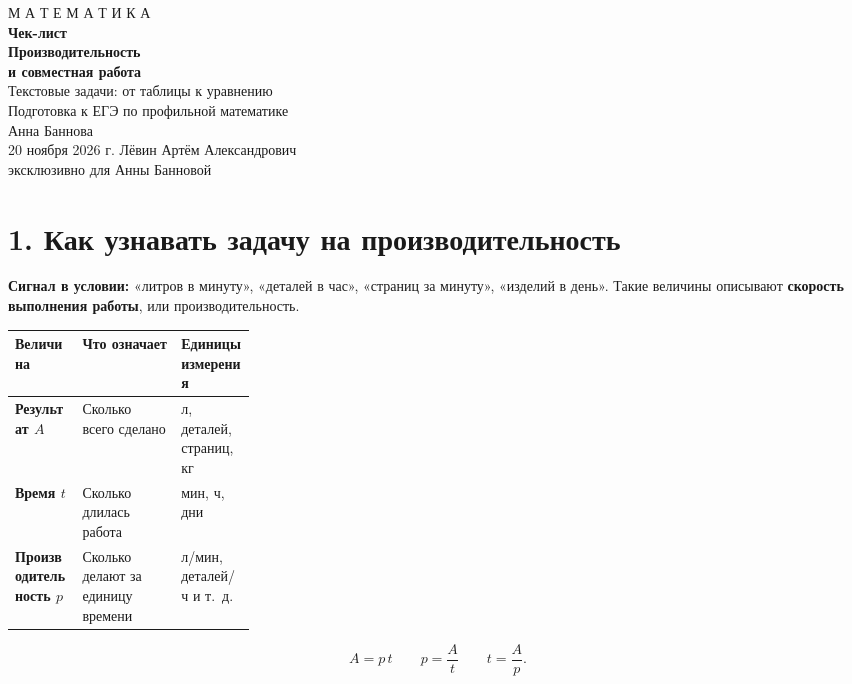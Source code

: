 \documentclass[a4paper,12pt]{article}
\newcommand{\topic}[1]{\section*{\textcolor{darkaccent}{#1}}}
\newcommand{\linekey}[1]{\textcolor{darkaccent}{\textbf{#1}}}
\begin{document}
\begin{titlepage}
\thispagestyle{empty}
\begin{center}
\vspace*{21mm}
{\large\textcolor{accent}{М А Т Е М А Т И К А}}\\[23mm]
{\Huge\bfseries Чек-лист}\\[9mm]
{\LARGE\bfseries Производительность\\[2mm] и совместная работа}\\[11mm]
{\large Текстовые задачи: от таблицы к уравнению}\\[24mm]
{\large Подготовка к ЕГЭ по профильной математике}\\[25mm]
{\Large Анна Баннова}\\[8mm]
{\large 20 ноября 2026 г.}
\vfill
{\normalsize Лёвин Артём Александрович}\\[2mm]
{\normalsize эксклюзивно для Анны Банновой}
\end{center}
\vspace{12mm}
\begin{center}
\end{center}
\end{titlepage}

\topic{1. Как узнавать задачу на производительность}
\linekey{Сигнал в условии:} «литров в минуту», «деталей в час», «страниц за минуту», «изделий в день». Такие величины описывают \textbf{скорость выполнения работы}, или производительность.

\begin{center}
\begin{tabularx}{\linewidth}{@{}>{\bfseries}p{0.28\linewidth}X X@{}}
\toprule
Величина & Что означает & Единицы измерения \\
\midrule
Результат $A$ & Сколько всего сделано & л, деталей, страниц, кг \\
Время $t$ & Сколько длилась работа & мин, ч, дни \\
Производительность $p$ & Сколько делают за единицу времени & л/мин, деталей/ч и т.~д. \\
\bottomrule
\end{tabularx}
\end{center}

\begin{equation*}
\boxed{A=p\,t}\qquad \boxed{p=\frac{A}{t}}\qquad \boxed{t=\frac{A}{p}}.
\end{equation*}
\end{document}
